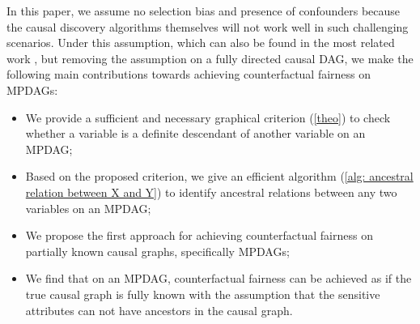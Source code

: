 \documentclass{article}
\begin{document}
In this paper, we assume no selection bias and presence of confounders because the causal discovery algorithms themselves will not work well in such challenging scenarios. Under this assumption, which can also be found in the most related work \citep{zhang2017causal, chiappa2019path, chikahara2021learning, wu2019counterfactual}, but removing the assumption on a fully directed causal DAG, we make the following main contributions towards achieving counterfactual fairness on MPDAGs:   
\begin{itemize}
\itemsep0em
    \item We provide a sufficient and necessary graphical criterion (\cref{theo}) to check whether a variable is a definite descendant of another variable on an MPDAG;
    \item Based on the proposed criterion, we give an efficient algorithm (\cref{alg: ancestral relation between X and Y}) to identify ancestral relations between any two variables on an MPDAG;
    \item We propose the first approach for achieving counterfactual fairness on partially known causal graphs, specifically MPDAGs;
    \item We find that on an MPDAG, counterfactual fairness can be achieved as if the true causal graph is fully known with the assumption that the sensitive attributes can not have ancestors in the causal graph.
\end{itemize}

\end{document}
